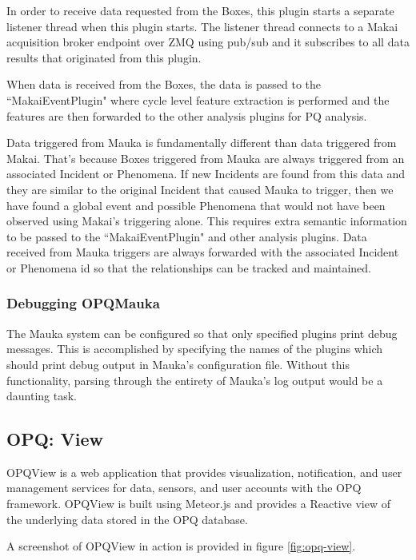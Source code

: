 In order to receive data requested from the Boxes, this plugin starts a separate listener thread when this plugin starts. The listener thread connects to a Makai acquisition broker endpoint over ZMQ using pub/sub and it subscribes to all data results that originated from this plugin. 

When data is received from the Boxes, the data is passed to the ``MakaiEventPlugin" where cycle level feature extraction is performed and the features are then forwarded to the other analysis plugins for PQ analysis. 

Data triggered from Mauka is fundamentally different than data triggered from Makai. That's because Boxes triggered from Mauka are always triggered from an associated Incident or Phenomena. If new Incidents are found from this data and they are similar to the original Incident that caused Mauka to trigger, then we have found a global event and possible Phenomena that would not have been observed using Makai's triggering alone. This requires extra semantic information to be passed to the ``MakaiEventPlugin" and other analysis plugins. Data received from Mauka triggers are always forwarded with the associated Incident or Phenomena id so that the relationships can be tracked and maintained. 

\subsubsection{Debugging OPQMauka}
The Mauka system can be configured so that only specified plugins print debug messages. This is accomplished by specifying the names of the plugins which should print debug output in Mauka's configuration file. Without this functionality, parsing through the entirety of Mauka's log output would be a daunting task.

\subsection{OPQ: View}
OPQView is a web application that provides visualization, notification, and user management services for data, sensors, and user accounts with the OPQ framework. OPQView is built using Meteor.js and provides a Reactive view of the underlying data stored in the OPQ database.

A screenshot of OPQView in action is provided in figure \ref{fig:opq-view}.

